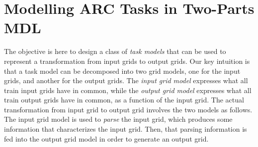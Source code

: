 \documentclass[a4paper]{llncs}
\newcommand{\HIDE}[1]{}
\begin{document}
\HIDE{
\section{Related Work}
\label{related}

This work is related to three domains, all part of the field of
Artificial Intelligence: {\em structured prediction} (as a sub-domain
of machine learning), {\em programming by example}, and the {\em
  Minimum Description Length (MDL)} principle.

{\em Structure prediction} is the sub-domain of supervised machine
learning where the outputs to predict are structured objects rather
than scalar values (discrete or
numeric)~\cite{ReviewStructPred,dietterich2008structured}. The output
grids of the ARC challenge are an example. Other common and recent
examples are found in natural language processing (NLP) and generative
media. Examples in NLP are parsing (predicting a parse
tree)~\cite{PredParseTree} or machine translation (predicting a word
sequence)~\cite{MachTransl}. Examples in generative media often use
generative adversarial networks (GAN) to generate photo-realistic
images, music songs or texts~\cite{GAN_App}. However, the previous
examples are not part of supervised machine learning because there is
not one (or a few) correct answer, the generated output ``only'' has
to be realistic to human perception. Structured prediction appears to
be mostly applied to sequences. Indeed, predicting a sequence of
symbols can be decomposed into repeatedly predicting the next
symbol. We could not find work predicting grid structures similar to
ARC grids.


Programming by example, ILP, ...

MDL work...
}%

\section{Modelling ARC Tasks in Two-Parts MDL}
\label{modelling}

The objective is here to design a class of {\em task models} that can
be used to represent a transformation from input grids to output
grids.
%
Our key intuition is that a task model can be decomposed into two grid
models, one for the input grids, and another for the output grids. The
{\em input grid model} expresses what all train input grids have in
common, while the {\em output grid model} expresses what all train
output grids have in common, as a function of the input grid.
%
The actual transformation from input grid to output grid involves the
two models as follows. The input grid model is used to {\em parse} the
input grid, which produces some information that characterizes the
input grid. Then, that parsing information is fed into the output grid
model in order to generate an output grid.
\end{document}
